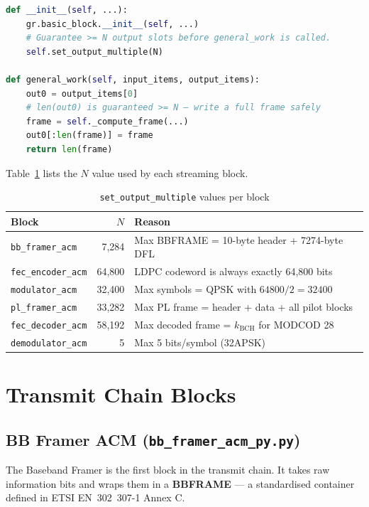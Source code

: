 \documentclass[12pt,a4paper]{report}
\begin{document}
\begin{lstlisting}[language=python, caption={Frame-aligned buffer pattern using set\_output\_multiple}]
def __init__(self, ...):
    gr.basic_block.__init__(self, ...)
    # Guarantee >= N output slots before general_work is called.
    self.set_output_multiple(N)

def general_work(self, input_items, output_items):
    out0 = output_items[0]
    # len(out0) is guaranteed >= N — write a full frame safely
    frame = self._compute_frame(...)
    out0[:len(frame)] = frame
    return len(frame)
\end{lstlisting}

Table~\ref{tab:som} lists the $N$ value used by each streaming block.

\begin{table}[H]
\centering
\caption{\texttt{set\_output\_multiple} values per block}
\label{tab:som}
\begin{tabular}{lrl}
\toprule
\textbf{Block}           & \textbf{$N$} & \textbf{Reason} \\
\midrule
\texttt{bb\_framer\_acm}   & 7,284  & Max BBFRAME = 10-byte header + 7274-byte DFL \\
\texttt{fec\_encoder\_acm} & 64,800 & LDPC codeword is always exactly 64,800 bits \\
\texttt{modulator\_acm}    & 32,400 & Max symbols = QPSK with $64800/2 = 32400$ \\
\texttt{pl\_framer\_acm}   & 33,282 & Max PL frame = header + data + all pilot blocks \\
\texttt{fec\_decoder\_acm} & 58,192 & Max decoded frame = $k_\text{BCH}$ for MODCOD 28 \\
\texttt{demodulator\_acm}  & 5      & Max 5 bits/symbol (32APSK) \\
\bottomrule
\end{tabular}
\end{table}

\section{Transmit Chain Blocks}

\subsection{BB Framer ACM (\texttt{bb\_framer\_acm\_py.py})}

The Baseband Framer is the first block in the transmit chain. It takes raw
information bits and wraps them in a \textbf{BBFRAME} --- a standardised
container defined in ETSI EN~302~307-1 Annex C.
\end{document}
